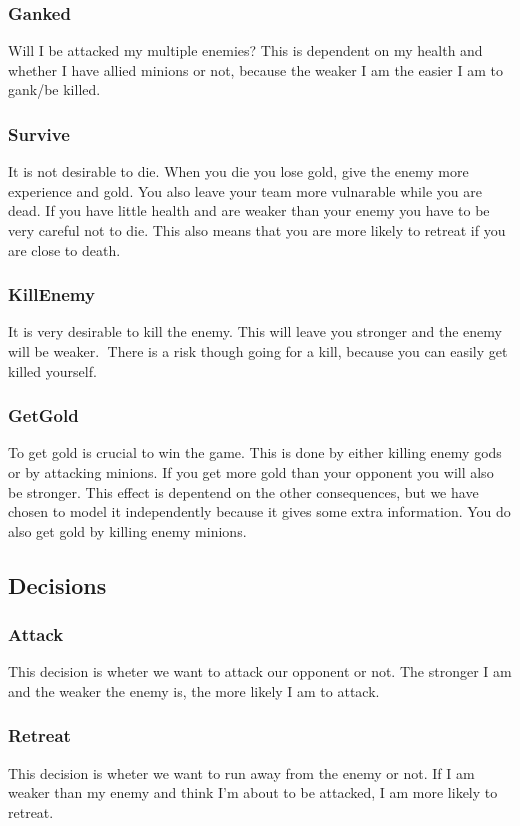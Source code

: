 \documentclass[titlepage]{article}
\begin{document}
\subsubsection*{Ganked}
Will I be attacked my multiple enemies? This is dependent on my health and whether I have allied minions or not, because the weaker I am the easier I am to gank/be killed.

\subsubsection*{Survive}
It is not desirable to die. When you die you lose gold, give the enemy more experience and gold. You also leave your team more vulnarable while you are dead. If you have little health and are weaker than your enemy you have to be very careful not to die. This also means that you are more likely to retreat if you are close to death.

\subsubsection*{KillEnemy}
It is very desirable to kill the enemy. This will leave you stronger and the enemy will be weaker. There is a risk though going for a kill, because you can easily get killed yourself.

\subsubsection*{GetGold}
To get gold is crucial to win the game. This is done by either killing enemy gods or by attacking minions. If you get more gold than your opponent you will also be stronger. This effect is depentend on the other consequences, but we have chosen to model it independently because it gives some extra information. You do also get gold by killing enemy minions. 


\subsection{Decisions}

\subsubsection*{Attack}
This decision is wheter we want to attack our opponent or not. The stronger I am and the weaker the enemy is, the more likely I am to attack.

\subsubsection*{Retreat}
This decision is wheter we want to run away from the enemy or not. If I am weaker than my enemy and think I'm about to be attacked, I am more likely to retreat.
\end{document}
